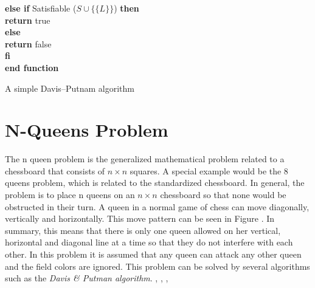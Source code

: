 \begin{listing}[h!]
    \hspace*{0.5cm} \textbf{else if} Satisfiable ($S \cup \{\{L\}\}$) \textbf{then}\\
      \hspace*{1.0cm} \textbf{return} true\\
    \hspace*{0.5cm} \textbf{else}\\
      \hspace*{1.0cm} \textbf{return} false\\
    \hspace*{0.5cm} \textbf{fi}\\
  \textbf{end function}
  \caption{A simple Davis–Putnam algorithm \cite{Zhang2000}}
  \label{code:recursiveDavisPutnam}
\end{listing}

\section{N-Queens Problem}
\label{sec:sciQueens}
The n queen problem is the generalized mathematical problem related to a chessboard that consists of $n \times n$ squares. A special example would be the 8 queens problem, which is related to the standardized chessboard. In general, the problem is to place n queens on an $n \times n$ chessboard so that none would be obstructed in their turn. A queen in a normal game of chess can move diagonally, vertically and horizontally. This move pattern can be seen in Figure \label{fig:queens-problem}. In summary, this means that there is only one queen allowed on her vertical, horizontal and diagonal line at a time so that they do not interfere with each other. In this problem it is assumed that any queen can attack any other queen and the field colors are ignored. This problem can be solved by several algorithms such as the \textit{Davis \& Putman algorithm}. \cite{Bell2009}, \cite{Watkins2012}, \cite[146\psq]{Nudelman1995}, \cite{Stroetman2019}


